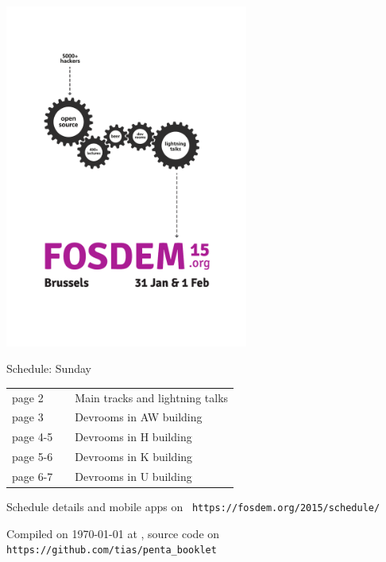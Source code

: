 \documentclass[a4paper,10pt]{article}
\begin{document}
\pagestyle{empty}
\label{cover}
\begin{center}
\includegraphics[width=0.6\textwidth]{artwork/flyer_nobg}


{\fontsize{40}{50}\selectfont
\bf

Schedule: Sunday
}

\vfill

{\huge
\begin{tabular}{lll}
page 2   & &  Main tracks and lightning talks \\
page 3   & &  Devrooms in AW building \\
page 4-5 & &  Devrooms in H building \\
page 5-6 & &  Devrooms in K building \\
page 6-7 & &  Devrooms in U building \\
\end{tabular}
}

\vfill

{\LARGE
Schedule details and mobile apps on ~\texttt{https://fosdem.org/2015/schedule/}
}

\vfill

\end{center}

Compiled on {\ddmmyyyydate\today} at \currenttime, source code on \texttt{https://github.com/tias/penta\_booklet}


{%
\fontsize{10}{7.4}\selectfont%
\renewcommand{\arraystretch}{0.9}%
%
%
}
\end{document}
